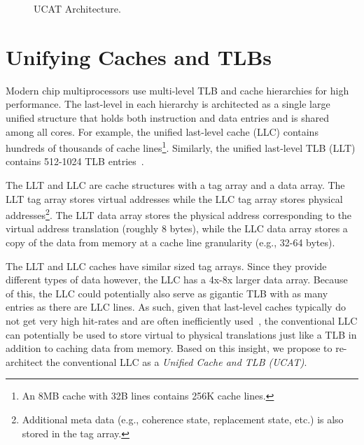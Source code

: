 \begin{figure*}[tbh] 
\vspace{-0. in}
\centering
\centerline{}
\caption{\small UCAT Architecture. \normalsize}
\label{fig:UCAT} 
\vspace{-0.0in}
\end{figure*}

\section{Unifying Caches and TLBs}
\label{sec:UCAT}

\noindent Modern chip multiprocessors use multi-level TLB and cache
hierarchies for high performance. The last-level in each hierarchy is
architected as a single large unified structure that holds both
instruction and data entries and is shared among all cores. For
example, the unified last-level cache (LLC) contains hundreds of
thousands of cache lines\footnote{An 8MB cache with 32B lines contains
256K cache lines.}. Similarly, the unified last-level TLB (LLT)
contains 512-1024 TLB entries~\cite{}.


The LLT and LLC are cache structures with a tag array and a data
array. The LLT tag array stores virtual addresses while the LLC tag
array stores physical addresses\footnote{Additional meta data (e.g.,
coherence state, replacement state, etc.) is also stored in the tag
array.}. The LLT data array stores the physical address corresponding
to the virtual address translation (roughly 8 bytes), while the LLC
data array stores a copy of the data from memory at a cache line
granularity (e.g., 32-64 bytes).

The LLT and LLC caches have similar sized tag arrays. Since they
provide different types of data however, the LLC has a 4x-8x larger
data array. Because of this, the LLC could potentially also serve as
gigantic TLB with as many entries as there are LLC lines.
As such, given that last-level caches typically do not get very high
hit-rates and are often inefficiently used~\cite{}, the conventional
LLC can potentially be used to store virtual to physical translations
just like a TLB in addition to caching data from memory. Based on this
insight, we propose to re-architect the conventional LLC as a {\em
Unified Cache and TLB (UCAT)}.


